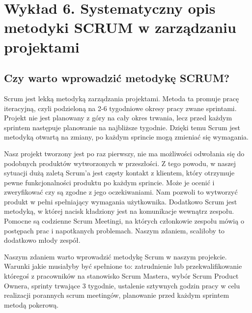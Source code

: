\chapter{Wykład 6. Systematyczny opis metodyki SCRUM w zarządzaniu projektami}

\section{Czy warto wprowadzić metodykę SCRUM?}

Scrum jest lekką metodyką zarządzania projektami.  Metoda ta promuje pracę iteracyjną, czyli podzieloną na 2-6 tygodniowe okresy pracy zwane sprintami. Projekt nie jest planowany z góry na cały okres trwania, lecz przed każdym sprintem następuje planowanie na najbliższe tygodnie. Dzięki temu Scrum jest metodyką otwartą na zmiany, po każdym sprincie mogą zmieniać się wymagania. 

Nasz projekt tworzony jest po raz pierwszy, nie ma możliwości odwołania się do podobnych produktów wytworzonych w przeszłości. Z tego powodu, w naszej sytuacji dużą zaletą Scrum’a jest częsty kontakt z klientem, który otrzymuje pewne funkcjonalności produktu po każdym sprincie.  Może je ocenić i zweryfikować czy są zgodne z jego oczekiwaniami. Nam pozwoli to wytworzyć produkt w pełni spełniający wymagania użytkownika. Dodatkowo Scrum jest metodyką, w której nacisk kładziony jest na komunikacje wewnątrz zespołu. Pomocne są codzienne Scrum Meetingi, na których członkowie zespołu mówią o postępach prac i napotkanych problemach. Naszym zdaniem, scaliłoby to dodatkowo młody zespół. 

Naszym zdaniem warto wprowadzić metodykę Scrum w naszym projekcie. Warunki jakie musiałyby być spełnione to: zatrudnienie lub przekwalifikowanie któregoś z pracowników na stanowisko Scrum Mastera,  wybór Scrum Product Ownera, sprinty trwające 3 tygodnie, ustalenie sztywnych godzin pracy w celu realizacji porannych scrum meetingów, planowanie przed każdym sprintem metodą pokerową.



